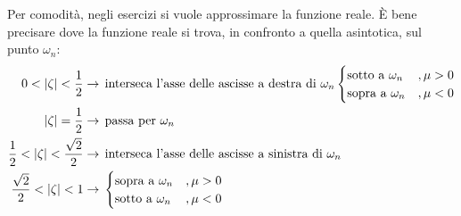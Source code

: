Per comodità, negli esercizi si vuole approssimare la funzione reale. È bene precisare dove la funzione reale si trova, in confronto a quella asintotica, sul punto $ \omega_n $:
\begin{align*}
	0<\lvert\zeta\rvert<\frac{1}{2} &\rightarrow \, \text{interseca l'asse delle ascisse a destra di $ \omega_n $}
		\begin{cases}
			\text{sotto a }\omega_n &,\mu >0\\
			\text{sopra a }\omega_n &,\mu <0
		\end{cases}\\
	\lvert\zeta\rvert =\frac{1}{2} &\rightarrow\, \text{passa per $ \omega_n $}\\
	\frac{1}{2}<\lvert\zeta\rvert<\frac{\sqrt{2}}{2} &\rightarrow \, \text{interseca l'asse delle ascisse a sinistra di $ \omega_n $}\\
	\frac{\sqrt{2}}{2}<\lvert\zeta\rvert<1 &\rightarrow \,
		\begin{cases}
			\text{sopra a }\omega_n &,\mu >0\\
			\text{sotto a }\omega_n &,\mu <0
		\end{cases}
\end{align*}



